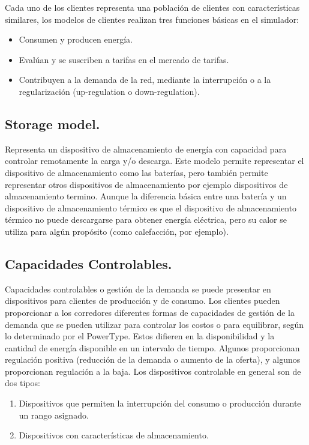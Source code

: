 Cada uno de los clientes representa una población de clientes con características similares, los modelos de clientes realizan tres funciones básicas en el simulador:

\begin{itemize}
	\item Consumen y producen energía.
	\item Evalúan y se suscriben  a tarifas en el mercado de tarifas.
	\item Contribuyen a la demanda de la red, mediante la interrupción o  a la regularización (up-regulation o down-regulation).	
\end{itemize}

\subsection{Storage model.}
Representa un dispositivo de almacenamiento de energía con capacidad para controlar remotamente la carga y/o descarga. Este modelo permite representar el dispositivo de almacenamiento como las baterías, pero también permite representar otros dispositivos de almacenamiento por ejemplo dispositivos de almacenamiento termino. Aunque la diferencia básica entre una batería y un dispositivo de almacenamiento térmico es que el dispositivo de almacenamiento térmico no puede descargarse para obtener energía eléctrica, pero su calor se utiliza para algún propósito (como calefacción, por ejemplo).

\subsection{Capacidades Controlables.}
Capacidades controlables o gestión de la demanda se puede presentar en dispositivos para clientes de producción y de consumo. Los clientes pueden proporcionar a los corredores diferentes formas de capacidades de gestión de la demanda que se pueden utilizar para controlar los costos o para equilibrar, según lo determinado por el PowerType. Estos difieren en la disponibilidad y la cantidad de energía disponible en un intervalo de tiempo. Algunos proporcionan regulación positiva (reducción de la demanda o aumento de la oferta), y algunos proporcionan regulación a la baja. Los dispositivos controlable en general son de dos tipos: 
\begin{enumerate}
	\item Dispositivos que permiten la interrupción del consumo o producción durante un rango asignado.
	\item Dispositivos con características de almacenamiento.
\end{enumerate}

